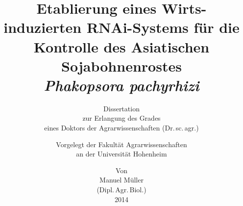\titlehead{%
\flushright
\texttt{[image: Deckblatt/logo1]}}
\subject{Aus dem Institut für Phytomedizin \\Fachgebiet Phytopathologie\\Prof.\,Dr.\,Ralf Vögele}
\title{Etablierung eines Wirts-induzierten RNAi-Systems für die Kontrolle des Asiatischen Sojabohnenrostes\\ \textit{Phakopsora pachyrhizi} }
\subtitle{
\vspace*{.5cm}
Dissertation\\ zur Erlangung des Grades\\eines Doktors der Agrarwissenschaften (Dr.\,sc.\,agr.)\\}

\author{
Vorgelegt der Fakultät Agrarwissenschaften\\ an der Universität Hohenheim\\}

\date{
Von\\ Manuel Müller\\(Dipl.\,Agr.\,Biol.)\\
\vspace*{.5cm}
2014}

\maketitle